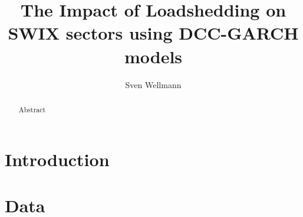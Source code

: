 \documentclass[11pt,preprint, authoryear]{elsarticle}
\numberwithin{equation}{section}
\numberwithin{figure}{section}
\numberwithin{table}{section}
\begin{document}
\begin{frontmatter}  %

\title{The Impact of Loadshedding on SWIX sectors using DCC-GARCH
models}





\author[Add1]{Sven Wellmann}





\address[Add1]{Stellenbosch University, Stellenbosch, South Africa}


\begin{abstract}
\small{
Abstract
}
\end{abstract}

\vspace{1cm}





\vspace{0.5cm}

\end{frontmatter}



\pagestyle{fancy}
\chead{}
\rhead{}
\lfoot{}
\lhead{}
\cfoot{}


\headsep 35pt %




\hypertarget{introduction}{%
\section{\texorpdfstring{Introduction
\label{Introduction}}{Introduction }}\label{introduction}}

\hypertarget{data}{%
\section*{Data}\label{data}}
\end{document}
